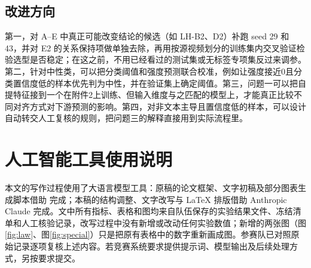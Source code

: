 \subsection{改进方向}

第一，对 A–E 中真正可能改变结论的候选（如 LH-B2、D2）补跑 seed 29 和 43，并对 E2 的关系保持项做单独去除，再用按源视频划分的训练集内交叉验证检验选型是否稳定；在这之前，不用已经看过的测试集或无标签专项集反过来调参。第二，针对中性类，可以把分类阈值和强度预测联合校准，例如让强度接近0且分类置信度低的样本优先判为中性，并在验证集上确定阈值。第三，问题一可以把自提特征接到一个在附件2上训练、但输入维度与之匹配的模型上，才能真正比较不同对齐方式对下游预测的影响。第四，对非文本主导且置信度低的样本，可以设计自动转交人工复核的规则，把问题三的解释直接用到实际流程里。

\section*{人工智能工具使用说明}

本文的写作过程使用了大语言模型工具：原稿的论文框架、文字初稿及部分图表生成脚本借助 完成；本稿的结构调整、文字改写与 LaTeX 排版借助 Anthropic Claude 完成。文中所有指标、表格和图均来自队伍保存的实验结果文件、冻结清单和人工核验记录，改写过程中没有新增或改动任何实验数值；新增的两张图（图\ref{fig:law}、图\ref{fig:special}）只是把原有表格中的数字重新画成图。参赛队已对照原始记录逐项复核上述内容。若竞赛系统要求提供提示词、模型输出及后续处理方式，另按要求提交。
